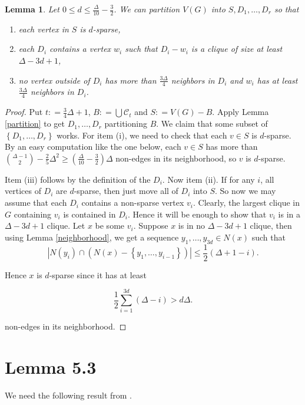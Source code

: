 \documentclass[12pt]{amsart}
\theoremstyle{plain}
\newtheorem{lem}[thm]{Lemma}
\theoremstyle{definition}
\theoremstyle{plain}
\newcommand{\fancy}[1]{\mathcal{#1}}
\newcommand{\CC}{\fancy{C}}
\newcommand{\set}[1]{\left\{ #1 \right\}}
\newcommand{\card}[1]{\left|#1\right|}
\newcommand{\DefinedAs}{\mathrel{\mathop:}=}
\begin{document}
\begin{lem}\label{improved}
Let $0 \leq d \leq \frac{\Delta}{10} - \frac32$. We can partition $V(G)$ into $S,D_1, \ldots, D_r$ so that

\begin{enumerate}
\item each vertex in $S$ is $d$-sparse,
\item each $D_i$ contains a vertex $w_i$ such that $D_i - w_i$ is a clique of size at least $\Delta - 3d + 1$,
\item no vertex outside of $D_i$ has more than $\frac{3\Delta}{4}$ neighbors in $D_i$ and $w_i$ has at least $\frac{3\Delta}{4}$ neighbors in $D_i$.
\end{enumerate}
\end{lem}
\begin{proof}
Put $t \DefinedAs \frac34 \Delta + 1$, $B \DefinedAs \bigcup \CC_t$ and $S \DefinedAs V(G) - B$. Apply Lemma \ref{partition} to get $D_1, \ldots, D_r$ partitioning $B$. We claim that some subset of $\set{D_1, \ldots, D_r}$ works.  For item (i), we need to check that each $v \in S$ is $d$-sparse.  By an easy computation like the one below, each $v \in S$ has more than $\binom{\Delta-1}{2} - \frac25 \Delta^2 \geq ( \frac{\Delta}{10} - \frac32)\Delta$ non-edges in its neighborhood, so $v$ is $d$-sparse.

Item (iii) follows by the definition of the $D_i$.  Now item (ii).  If for any $i$, all vertices of $D_i$ are $d$-sparse, then just move all of $D_i$ into $S$.  So now we may assume that each $D_i$ contains a non-sparse vertex $v_i$.  Clearly, the largest clique in $G$ containing $v_i$ is contained in $D_i$.  Hence it will be enough to show that $v_i$ is in a $\Delta - 3d + 1$ clique.  Let $x$ be some $v_i$. Suppose $x$ is in no $\Delta - 3d + 1$ clique, then using Lemma \ref{neighborhood}, we get a sequence $y_1,
\ldots, y_{3d} \in N(x)$ such that 
\[\card{N(y_i) \cap (N(x) - \set{y_1, \ldots, y_{i-1}})} \leq \frac12 (\Delta + 1 - i).\]

Hence $x$ is $d$-sparse since it has at least 

\[\frac12\sum_{i=1}^{3d} (\Delta - i) > d\Delta.\]

non-edges in its neighborhood.
\end{proof}

\section{Lemma 5.3}
We need the following result from \cite{mules}.
\end{document}
